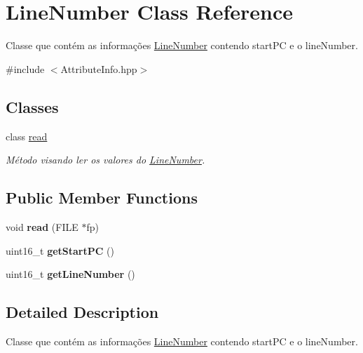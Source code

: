 \hypertarget{classLineNumber}{}\section{Line\+Number Class Reference}
\label{classLineNumber}


Classe que contém as informações \hyperlink{classLineNumber}{Line\+Number} contendo start\+PC e o line\+Number.  




{\ttfamily \#include $<$Attribute\+Info.\+hpp$>$}

\subsection*{Classes}
\begin{DoxyCompactItemize}
\item 
class \hyperlink{classLineNumber_1_1read}{read}
\begin{DoxyCompactList}\small\item\em Método visando ler os valores do \hyperlink{classLineNumber}{Line\+Number}. \end{DoxyCompactList}\end{DoxyCompactItemize}
\subsection*{Public Member Functions}
\begin{DoxyCompactItemize}
\item 
void {\bfseries read} (F\+I\+LE $\ast$fp)\hypertarget{classLineNumber_a0ba6d96af3e99d0d235b48247852d3a0}{}\label{classLineNumber_a0ba6d96af3e99d0d235b48247852d3a0}

\item 
uint16\+\_\+t {\bfseries get\+Start\+PC} ()\hypertarget{classLineNumber_abf15057e0389883a4401e42e399ebce5}{}\label{classLineNumber_abf15057e0389883a4401e42e399ebce5}

\item 
uint16\+\_\+t {\bfseries get\+Line\+Number} ()\hypertarget{classLineNumber_a69150854a991eba36b8ef7916d6dae10}{}\label{classLineNumber_a69150854a991eba36b8ef7916d6dae10}

\end{DoxyCompactItemize}


\subsection{Detailed Description}
Classe que contém as informações \hyperlink{classLineNumber}{Line\+Number} contendo start\+PC e o line\+Number. 

